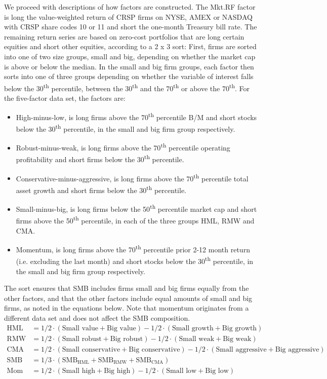 We proceed with descriptions of how factors are constructed. The Mkt.RF factor is long the value-weighted return of CRSP firms on NYSE, AMEX or NASDAQ with CRSP share codes 10 or 11 and short the one-month Treasury bill rate. The remaining return series are based on zero-cost portfolios that are long certain equities and short other equities, according to a 2 x 3 sort: First, firms are sorted into one of two size groups, small and big, depending on whether the market cap is above or below the median. In the small and big firm groups, each factor then sorts into one of three groups depending on whether the variable of interest falls below the 30\textsuperscript{th} percentile, between the 30\textsuperscript{th} and the 70\textsuperscript{th} or above the 70\textsuperscript{th}. For the five-factor data set, the factors are:
\begin{itemize}
  \item High-minus-low, is long firms above the 70\textsuperscript{th} percentile B/M and short stocks below the 30\textsuperscript{th} percentile, in the small and big firm group respectively.
  \item Robust-minus-weak, is long firms above the 70\textsuperscript{th} percentile operating profitability and short firms below the 30\textsuperscript{th} percentile. 
  \item Conservative-minus-aggressive, is long firms above the 70\textsuperscript{th} percentile total asset growth and short firms below the 30\textsuperscript{th} percentile. 
  \item Small-minus-big, is long firms below the 50\textsuperscript{th} percentile market cap and short firms above the 50\textsuperscript{th} percentile, in each of the three groups HML, RMW and CMA.
  \item Momentum, is long firms above the 70\textsuperscript{th} percentile prior 2-12 month return (i.e. excluding the last month) and short stocks below the 30\textsuperscript{th} percentile, in the small and big firm group respectively.
\end{itemize}
The sort ensures that SMB includes firms small and big firms equally from the other factors, and that the other factors include equal amounts of small and big firms, as noted in the equations below. Note that momentum originates from a different data set and does not affect the SMB composition.
\begin{align*}
  \text{HML} &= 1/2 \cdot (\text{Small value} + \text{Big value}) - 1/2 \cdot (\text{Small growth} + \text{Big growth}) \\
  \text{RMW} &= 1/2 \cdot (\text{Small robust} + \text{Big robust}) - 1/2 \cdot (\text{Small weak} + \text{Big weak}) \\
  \text{CMA} &= 1/2 \cdot (\text{Small conservative} + \text{Big conservative}) - 1/2 \cdot (\text{Small aggressive} + \text{Big aggressive}) \\
  \text{SMB} &= 1/3 \cdot (\text{SMB}_\text{HML} + \text{SMB}_\text{RMW} + \text{SMB}_\text{CMA}) \\
  \text{Mom} &= 1/2 \cdot (\text{Small high} + \text{Big high}) - 1/2 \cdot (\text{Small low} + \text{Big low})
\end{align*}

